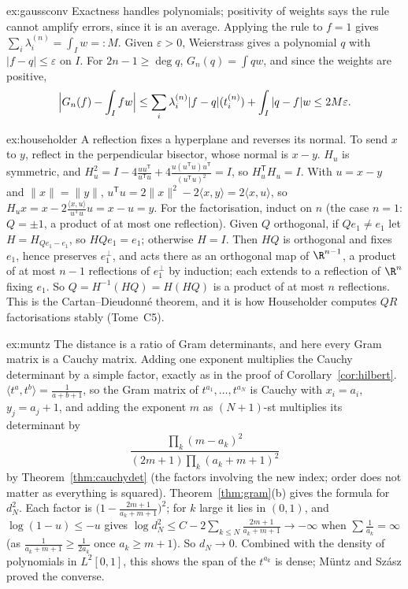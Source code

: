 \begin{solution}{ex:gaussconv}
\idea Exactness handles polynomials; positivity of weights says the rule cannot amplify errors, since it is an average.
\writeup Applying the rule to $f=1$ gives $\sum_i\lambda_i^{(n)}=\int_Iw=:M$. Given $\varepsilon>0$, Weierstrass gives a
polynomial $q$ with $|f-q|\le\varepsilon$ on $I$. For $2n-1\ge\deg q$, $G_n(q)=\int qw$, and since the weights are
positive,
\[
\Bigl|G_n(f)-\int_Ifw\Bigr|\le\sum_i\lambda_i^{(n)}|f-q|(t_i^{(n)})+\int_I|q-f|w\le2M\varepsilon.
\]
\end{solution}

\begin{solution}{ex:householder}
\idea A reflection fixes a hyperplane and reverses its normal. To send $x$ to $y$, reflect in the perpendicular bisector,
whose normal is $x-y$.
\writeup $H_u$ is symmetric, and $H_u^2=I-4\frac{uu^{\mathsf T}}{u^{\mathsf T}u}+4\frac{u(u^{\mathsf T}u)u^{\mathsf T}}{(u^{\mathsf T}u)^2}=I$,
so $H_u^{\mathsf T}H_u=I$. With $u=x-y$ and $\|x\|=\|y\|$, $u^{\mathsf T}u=2\|x\|^2-2\langle x,y\rangle=2\langle x,u\rangle$, so
$H_ux=x-2\frac{\langle x,u\rangle}{u^{\mathsf T}u}u=x-u=y$. For the factorisation, induct on $n$ (the case $n=1$: $Q=\pm1$,
a product of at most one reflection). Given $Q$ orthogonal, if $Qe_1\ne e_1$ let $H=H_{Qe_1-e_1}$, so $HQe_1=e_1$;
otherwise $H=I$. Then $HQ$ is orthogonal and fixes $e_1$, hence preserves $e_1^\perp$, and acts there as an orthogonal
map of $\R^{n-1}$, a product of at most $n-1$ reflections of $e_1^\perp$ by induction; each extends to a reflection of
$\R^n$ fixing $e_1$. So $Q=H^{-1}(HQ)=H(HQ)$ is a product of at most $n$ reflections. This is the Cartan--Dieudonn\'e
theorem, and it is how Householder computes $QR$ factorisations stably (Tome~C5).
\end{solution}

\begin{solution}{ex:muntz}
\idea The distance is a ratio of Gram determinants, and here every Gram matrix is a Cauchy matrix. Adding one exponent
multiplies the Cauchy determinant by a simple factor, exactly as in the proof of Corollary~\ref{cor:hilbert}.
\writeup $\langle t^a,t^b\rangle=\frac1{a+b+1}$, so the Gram matrix of $t^{a_1},\dots,t^{a_N}$ is Cauchy with $x_i=a_i$,
$y_j=a_j+1$, and adding the exponent $m$ as $(N+1)$-st multiplies its determinant by
\[
\frac{\prod_k(m-a_k)^2}{(2m+1)\prod_k(a_k+m+1)^2}
\]
by Theorem~\ref{thm:cauchydet} (the factors involving the new index; order does not matter as everything is squared).
Theorem~\ref{thm:gram}(b) gives the formula for $d_N^2$. Each factor is $\bigl(1-\frac{2m+1}{a_k+m+1}\bigr)^2$; for $k$
large it lies in $(0,1)$, and $\log(1-u)\le-u$ gives $\log d_N^2\le C-2\sum_{k\le N}\frac{2m+1}{a_k+m+1}\to-\infty$ when
$\sum\frac1{a_k}=\infty$ (as $\frac1{a_k+m+1}\ge\frac1{2a_k}$ once $a_k\ge m+1$). So $d_N\to0$. Combined with the density
of polynomials in $L^2[0,1]$, this shows the span of the $t^{a_k}$ is dense; M\"untz and Sz\'asz proved the converse.
\end{solution}

